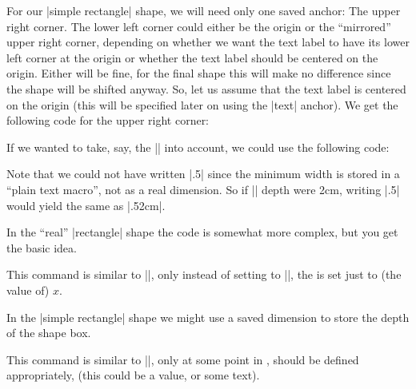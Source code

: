 \begin{command}{\pgfdeclareshape{}}
\begin{command}{\savedanchor{}}
        For our |simple rectangle| shape, we will need only one saved anchor:
        The upper right corner. The lower left corner could either be the
        origin or the ``mirrored'' upper right corner, depending on whether we
        want the text label to have its lower left corner at the origin or
        whether the text label should be centered on the origin. Either will be
        fine, for the final shape this will make no difference since the shape
        will be shifted anyway. So, let us assume that the text label is
        centered on the origin (this will be specified later on using the
        |text| anchor). We get the following code for the upper right corner:
\begin{codeexample}
\savedanchor{\upperrightcorner}{
  \pgf@y=.5\ht\pgfnodeparttextbox %
  \pgf@x=.5\wd\pgfnodeparttextbox %
}
\end{codeexample}

        If we wanted to take, say, the |\pgfshapeminwidth| into account, we
        could use the following code:
\begin{codeexample}
\end{codeexample}
        Note that we could not have written |.5\pgfshapeminwidth| since the
        minimum width is stored in a ``plain text macro'', not as a real
        dimension. So if |\pgfshapeminwidth| depth were 2cm, writing
        |.5\pgfshapeminwidth| would yield the same as |.52cm|.

        In the ``real'' |rectangle| shape the code is somewhat more complex,
        but you get the basic idea.
    \end{command}
    \begin{command}{\saveddimen{}}
        This command is similar to |\savedanchor|, only instead of setting
         to ||, the  is set
        just to (the value of) $x$.

        In the |simple rectangle| shape we might use a saved dimension to store
        the depth of the shape box.
\begin{codeexample}
\saveddimen{\depth}{
  \pgf@x=\dp\pgfnodeparttextbox
}
\end{codeexample}
    \end{command}
    \begin{command}{\savedmacro{}}
        This command is similar to |\saveddimen|, only at some point in
        ,  should be defined appropriately, (this
        could be a value, or some text).


\end{command}
\end{command}
